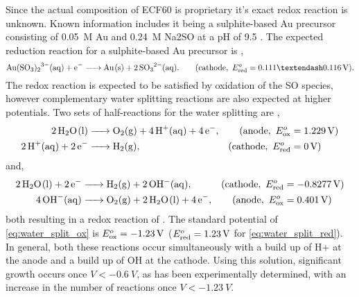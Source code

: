 \documentclass{article}
\begin{document}
Since the actual composition of ECF60 is proprietary it's exact redox reaction is unknown. Known information includes it being a sulphite-based Au precursor consisting of \SI{0.05}{M} Au and \SI{0.24}{M} Na\subs2SO at a pH of 9.5 \cite{roy2009electrochemical}. The expected reduction reaction for a sulphite-based Au precursor is \cite{green2007gold},
\begin{equation}
	\ce{Au(SO3)2^{3-}(aq) + e- -> Au(s) + 2SO3^{2-}(aq)}. \qquad (\mathrm{cathode},\ \Ered=0.111\textendash\SI{0.116}{V}).
\end{equation}
The redox reaction is expected to be satisfied by oxidation of the SO species, however complementary water splitting reactions are also expected at higher potentials. Two sets of half-reactions for the water splitting are \cite{haynes2013crc},
\begin{subequations}
\begin{align}
	\ce{2H2O(l) &-> O2(g) + 4H+(aq) + 4e-}, &(\mathrm{anode},\ \Eox&=\SI{1.229}{V}) \label{eq:water_split_ox} \\
	\ce{2H+(aq) + 2e- &-> H2(g)}, &(\mathrm{cathode},\ \Ered&=\SI{0}{V})
\end{align}
\end{subequations}
and,
\begin{subequations}
\begin{align}
	\ce{2H2O(l) + 2e- &-> H2(g) + 2OH^-(aq)}, &(\mathrm{cathode},\ \Ered&=\SI{-0.8277}{V}) \label{eq:water_split_red} \\
	\ce{4OH^-(aq) &-> O2(g) + 2H2O(l) + 4e-}, &(\mathrm{anode},\ \Eox&=\SI{0.401}{V})
\end{align}
\end{subequations}
both resulting in a redox reaction of . The standard potential of \eqref{eq:water_split_ox} is $E^o_{\mathrm{ox}}=\SI{-1.23}{V}$ ($E^o_{\mathrm{red}}=\SI{1.23}{V}$ for \eqref{eq:water_split_red}). In general, both these reactions occur simultaneously with a build up of H\sups+ at the anode and a build up of OH\sups{\textminus} at the cathode. %
Using this solution, significant growth occurs once $V<\SI{-0.6}{V}$, as has been experimentally determined, with an increase in the number of reactions once $V<\SI{-1.23}{V}$.
\end{document}
